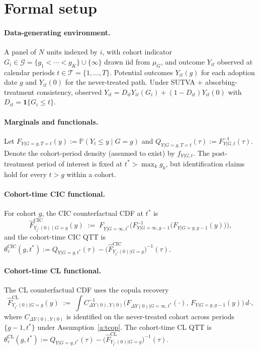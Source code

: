 \documentclass[11pt]{article}
\renewcommand{\Pr}{\mathbb{P}}
\newcommand{\one}{\mathbf{1}}
\theoremstyle{definition}
\theoremstyle{plain}
\theoremstyle{remark}
\begin{document}
\section{Formal setup}

\paragraph{Data-generating environment.} A panel of $N$ units indexed by $i$, with cohort indicator $G_i \in \mathcal{G} = \{g_1 < \cdots < g_K\} \cup \{\infty\}$ drawn iid from $\mu_G$, and outcome $Y_{it}$ observed at calendar periods $t \in \mathcal{T} = \{1, \ldots, T\}$. Potential outcomes $Y_{it}(g)$ for each adoption date $g$ and $Y_{it}(0)$ for the never-treated path. Under SUTVA + absorbing-treatment consistency, observed $Y_{it} = D_{it} Y_{it}(G_i) + (1 - D_{it}) Y_{it}(0)$ with $D_{it} = \one\{G_i \le t\}$.

\paragraph{Marginals and functionals.} Let $F_{Y|G=g, T=t}(y) := \Pr(Y_t \le y \mid G = g)$ and $Q_{Y|G=g,T=t}(\tau) := F^{-1}_{Y|G,t}(\tau)$. Denote the cohort-period density (assumed to exist) by $f_{Y|G,t}$. The post-treatment period of interest is fixed at $t^* > \max_k g_k$, but identification claims hold for every $t > g$ within a cohort.

\paragraph{Cohort-time CIC functional.} For cohort $g$, the CIC counterfactual CDF at $t^*$ is
\[
  \widehat{F}^{\mathrm{CIC}}_{Y_{t^*}(0) \mid G = g}(y) \;:=\; F_{Y|G=\infty, t^*}\!\Big(F^{-1}_{Y|G=\infty, g-1}\!\big(F_{Y|G=g, g-1}(y)\big)\Big),
\]
and the cohort-time CIC QTT is $\theta^{\mathrm{CIC}}_\tau(g, t^*) := Q_{Y|G=g, t^*}(\tau) - \big(\widehat{F}^{\mathrm{CIC}}_{Y_{t^*}(0)|G=g}\big)^{-1}(\tau)$.

\paragraph{Cohort-time CL functional.} The CL counterfactual CDF uses the copula recovery
\[
  \widehat{F}^{\mathrm{CL}}_{Y_{t^*}(0)|G=g}(y) \;:=\; \int C^{-1}_{\Delta Y(0), Y(0)}\!\big(F_{\Delta Y(0)|G=\infty, t^*}(\cdot), \, F_{Y|G=g, g-1}(y)\big)\,d\cdot,
\]
where $C_{\Delta Y(0), Y(0)}$ is identified on the never-treated cohort across periods $\{g-1, t^*\}$ under Assumption~\ref{a:tcop}. The cohort-time CL QTT is $\theta^{\mathrm{CL}}_\tau(g, t^*) := Q_{Y|G=g, t^*}(\tau) - \big(\widehat{F}^{\mathrm{CL}}_{Y_{t^*}(0)|G=g}\big)^{-1}(\tau)$.
\end{document}
